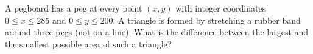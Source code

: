 A pegboard has a peg at every point $(x,y)$ with integer coordinates $0\le x\le285$ and $0\le y\le200$. A triangle is formed by stretching a rubber band around three pegs (not on a line). What is the difference between the largest and the smallest possible area of such a triangle?
